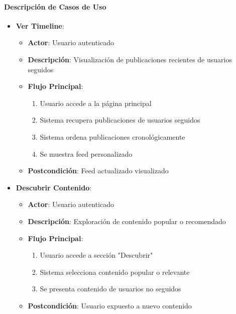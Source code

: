 \documentclass[12pt,letterpaper]{article}
\begin{document}
\paragraph{Descripción de Casos de Uso}
\begin{itemize}
    \item \textbf{Ver Timeline}:
    \begin{itemize}
        \item \textbf{Actor}: Usuario autenticado
        \item \textbf{Descripción}: Visualización de publicaciones recientes de usuarios seguidos
        \item \textbf{Flujo Principal}:
        \begin{enumerate}
            \item Usuario accede a la página principal
            \item Sistema recupera publicaciones de usuarios seguidos
            \item Sistema ordena publicaciones cronológicamente
            \item Se muestra feed personalizado
        \end{enumerate}
        \item \textbf{Postcondición}: Feed actualizado visualizado
    \end{itemize}
    
    \item \textbf{Descubrir Contenido}:
    \begin{itemize}
        \item \textbf{Actor}: Usuario autenticado
        \item \textbf{Descripción}: Exploración de contenido popular o recomendado
        \item \textbf{Flujo Principal}:
        \begin{enumerate}
            \item Usuario accede a sección "Descubrir"
            \item Sistema selecciona contenido popular o relevante
            \item Se presenta contenido de usuarios no seguidos
        \end{enumerate}
        \item \textbf{Postcondición}: Usuario expuesto a nuevo contenido
    \end{itemize}
    

\end{itemize}
\end{document}
